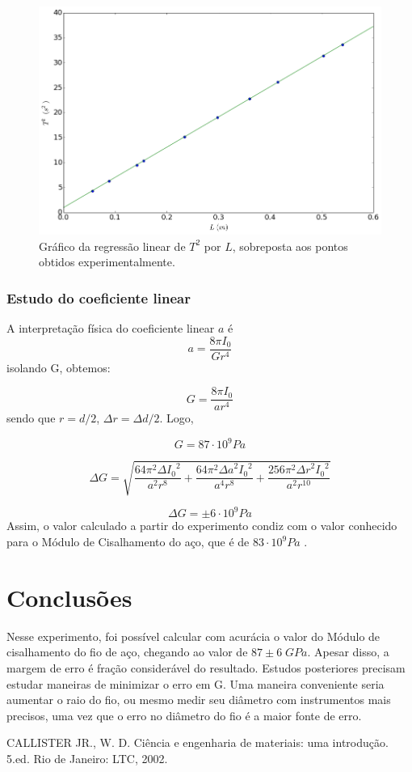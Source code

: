 \documentclass[12pt,a4paper]{article}
\begin{document}
\begin{figure}[!htbp]
 
\includegraphics[scale=0.6]{graf1.png}
\caption{Gráfico da regressão linear de $T^2$ por $L$, sobreposta aos pontos obtidos experimentalmente.} 
\end{figure} 
\subsubsection{Estudo do coeficiente linear}

A interpretação física do coeficiente linear $a$ é 
$$ a = \frac{8\pi I_0}{G r^4}  $$
isolando G, obtemos:

$$ G = \frac{8\pi I_0}{a r^4}  $$
sendo que $r = d/2$, $\Delta r = {\Delta d}/{2} $. Logo,

$$ G =  87 \cdot 10^9 Pa $$

$$ \Delta G = \sqrt{\frac{64 \pi^{2} {\Delta I_0}^{2}}{a^{2} r^{8}} + \frac{64 \pi^{2} {\Delta a}^{2} {I_0}^{2}}{a^{4} r^{8}} + \frac{256 \pi^{2} {\Delta r}^{2} {I_0}^{2}}{a^{2} r^{10}}} $$


$$ \Delta G = \pm 6 \cdot 10^9 Pa$$
Assim, o valor calculado a partir do experimento condiz com o valor conhecido para o Módulo de Cisalhamento do aço, que é de $83 \cdot 10^9 Pa$ \cite{callister}.





\section{Conclusões}
Nesse experimento, foi possível calcular com acurácia o valor do Módulo de cisalhamento do fio de aço, chegando ao valor de $87 \pm 6 \; GPa$. Apesar disso, a margem de erro é fração considerável do resultado. Estudos posteriores precisam estudar maneiras de minimizar o erro em G. Uma maneira conveniente seria aumentar o raio do fio, ou mesmo medir seu diâmetro com instrumentos mais precisos, uma vez que o erro no diâmetro do fio é a maior fonte de erro.



\begin{thebibliography}{9}

  CALLISTER JR., W. D. Ciência e engenharia de materiais: uma introdução. 5.ed. Rio de Janeiro: LTC, 2002.

\end{thebibliography}
\end{document}
